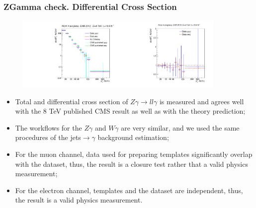 \begin{frame}\frametitle{ZGamma check. Differential Cross Section}
\begin{figure}[htb]
  \begin{center}
 \includegraphics[width=0.45\textwidth]{../figs/figs_v11/ChannelsMERGED_ZGamma/CrossSection/compareCSZGamma.pdf}\includegraphics[width=0.45\textwidth]{../figs/figs_v11/ChannelsMERGED_ZGamma/CrossSection/compareCSratioOttoZGamma.pdf}
  \end{center}
\end{figure}
  \tiny
  \begin{itemize}
    \item Total and differential cross section of $Z\gamma\rightarrow ll\gamma$ is measured and agrees well with the 8 TeV published CMS result as well as with the theory prediction;
     \item The workflows for the $Z\gamma$ and $W\gamma$ are very similar, and we used the same procedures of the jets$\rightarrow\gamma$ background estimation;
     \item For the muon channel, data used for preparing templates significantly overlap with the dataset, thus, the result is a closure test rather that a valid physics measurement;
     \item For the electron channel, templates and the dataset are independent, thus, the result is a valid physics measurement. 
  \end{itemize}
\end{frame}%
